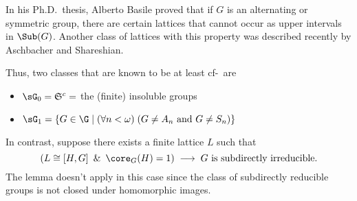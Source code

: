 \begin{frame}[label=ExamplesPreziBasile]{}
In his Ph.D.~thesis, Alberto Basile proved that if
$G$ is an alternating or symmetric group, there are certain lattices that
cannot occur as upper intervals in $\Sub(G)$. 
\vskip5mm
Another class of lattices with
this property was described recently by Aschbacher and Shareshian.
      \begin{center}
    {
        \begin{tikzpicture}[scale=.4]
          
        \end{tikzpicture}
}
      \end{center}
\end{frame}


\begin{frame}[label=ExamplesPreziTwoClasses]{}
Thus, two classes that are known to be at least cf-\IE\ are
\vskip2mm
\begin{itemize}
\item $\sG_0 = \mathfrak{S}^c = $ the (finite) insoluble groups
\vskip2mm
\item $\sG_1 =\{G\in \G \mid (\forall n<\omega) \; (G \neq A_n \text{ and }  G\neq S_n) \}$
\end{itemize}
\vskip5mm
\end{frame}


\begin{frame}[label=IEPropsSubdir]{}
In contrast, suppose %
there exists a finite lattice $L$ such that
 \[
 (L \cong [H, G] \,\text{ \& }\, \core_G(H)=1) \; \longrightarrow \; G
 \text{ is subdirectly irreducible.}  %
\]
The lemma doesn't apply in this case since the class of
subdirectly reducible groups is not closed under homomorphic 
images.
\end{frame}

